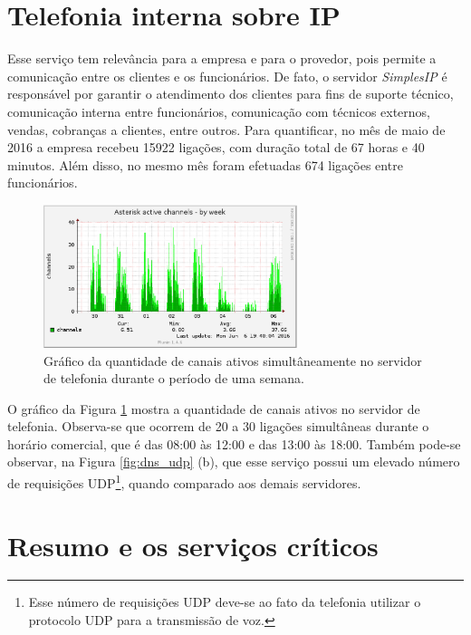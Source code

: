 \section{Telefonia interna sobre IP}
\label{section:telefonia}

Esse serviço tem relevância para a empresa e para o provedor, pois permite a comunicação entre os clientes e os funcionários. De fato, o 
servidor \textit{SimplesIP} é responsável por garantir o atendimento dos clientes para fins de suporte técnico, comunicação interna entre 
funcionários, comunicação com técnicos externos, vendas, cobranças a clientes, entre outros. Para quantificar, no mês de maio de 2016 a empresa 
recebeu 15922 ligações, com duração total de 67 horas e 40 minutos. Além disso, no mesmo mês foram efetuadas 674 ligações entre funcionários. 

\begin{figure}[h!]
 \centering
 \includegraphics[width=280px]{img/simplesip_week.eps}
 \caption{Gráfico da quantidade de canais ativos simultâneamente no servidor de telefonia durante o período de uma semana.}
 \label{fig:simplesip_week}
\end{figure}

O gráfico da Figura \ref{fig:simplesip_week} mostra a quantidade de canais ativos no servidor de telefonia. Observa-se que ocorrem 
de 20 a 30 ligações simultâneas durante o horário comercial, que é das 08:00 às 12:00 e das 13:00 às 18:00. Também pode-se observar, na Figura 
\ref{fig:dns_udp} (b), que esse serviço possui um elevado número de requisições \ac{UDP}\footnote[2]{Esse número de requisições \ac{UDP} 
deve-se ao fato da telefonia utilizar o protocolo \ac{UDP} para a transmissão de voz.}, quando comparado aos demais servidores.

\section{Resumo e os serviços críticos}
\label{section:maqservcrit}

